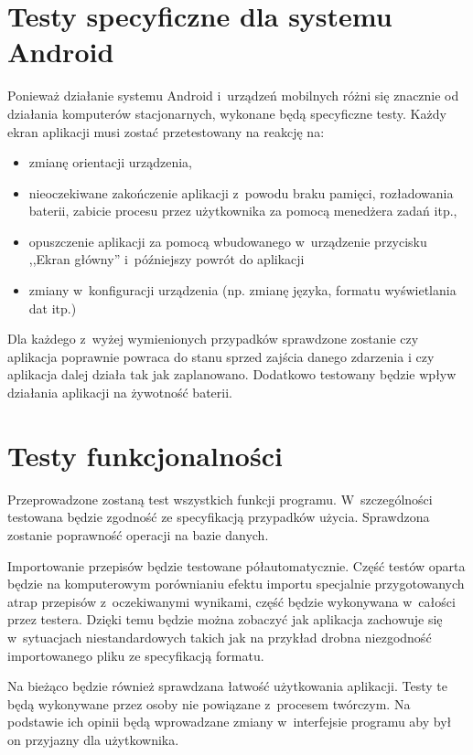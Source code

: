 \documentclass[a4paper,11pt,titlepage,twoside]{mwart}
\begin{document}
\section{Testy specyficzne dla systemu Android}
Ponieważ działanie systemu Android i~urządzeń mobilnych różni się znacznie od działania komputerów stacjonarnych, wykonane będą specyficzne testy. Każdy ekran aplikacji musi zostać przetestowany na reakcję na:
\begin{itemize}
  \item zmianę orientacji urządzenia,
  \item nieoczekiwane zakończenie aplikacji z~powodu braku pamięci, rozładowania baterii, zabicie procesu przez użytkownika za pomocą menedżera zadań itp.,
  \item opuszczenie aplikacji za pomocą wbudowanego w~urządzenie przycisku ,,Ekran główny'' i~późniejszy powrót do aplikacji
  \item zmiany w~konfiguracji urządzenia (np. zmianę języka, formatu wyświetlania dat itp.)
\end{itemize}
Dla każdego z~wyżej wymienionych przypadków sprawdzone zostanie czy aplikacja poprawnie powraca do stanu sprzed zajścia danego zdarzenia i czy aplikacja dalej działa tak jak zaplanowano. Dodatkowo testowany będzie wpływ działania aplikacji na żywotność baterii.
\section{Testy funkcjonalności}
Przeprowadzone zostaną test wszystkich funkcji programu. W~szczególności testowana będzie zgodność ze specyfikacją przypadków użycia. Sprawdzona zostanie poprawność operacji na bazie danych.

Importowanie przepisów będzie testowane półautomatycznie. Część testów oparta będzie na komputerowym porównianiu efektu importu specjalnie przygotowanych atrap przepisów z~oczekiwanymi wynikami, część będzie wykonywana w~całości przez testera. Dzięki temu będzie można zobaczyć jak aplikacja zachowuje się w~sytuacjach niestandardowych takich jak na przykład drobna niezgodność importowanego pliku ze specyfikacją formatu.

Na bieżąco będzie również sprawdzana łatwość użytkowania aplikacji. Testy te będą wykonywane przez osoby nie powiązane z~procesem twórczym. Na podstawie ich opinii będą wprowadzane zmiany w~interfejsie programu aby był on przyjazny dla użytkownika.
\end{document}
